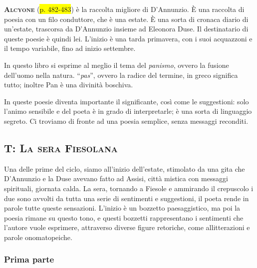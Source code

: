 \documentclass{book}
\newcommand{\pagine}[1]{\colorbox{yellow}{#1}}
\newcounter{mar}
\begin{document}
\textsc{\textbf{Alcyone}} (\pagine{p. 482-483}) è la raccolta migliore di
D'Annunzio. È una raccolta di poesia con un filo conduttore, che è una
estate. È una sorta di cronaca diario di un'estate, trascorsa da
D'Annunzio insieme ad Eleonora Duse. Il destinatario di queste poesie è
quindi lei. L'inizio è una tarda primavera, con i suoi acquazzoni e il
tempo variabile, fino ad inizio settembre.

In questo libro si esprime al meglio il tema del \emph{panismo}, ovvero
la fusione dell'uomo nella natura. ``\emph{pas}'', ovvero la radice del
termine, in greco significa tutto; inoltre Pan è una divinità boschiva.

In queste poesie diventa importante il significante, così come le
suggestioni: solo l'animo sensibile e del poeta è in grado di
interpretarle; è una sorta di linguaggio segreto. Ci troviamo di fronte
ad una poesia semplice, senza messaggi reconditi.

\subsection{T: \textsc{La sera Fiesolana}}

Una delle prime del ciclo, siamo all'inizio dell'estate, stimolato da
una gita che D'Annunzio e la Duse avevano fatto ad Assisi, città mistica
con messaggi spirituali, giornata calda. La sera, tornando a Fiesole e
ammirando il crepuscolo i due sono avvolti da tutta una serie di
sentimenti e suggestioni, il poeta rende in parole tutte queste
sensazioni. L'inizio è un bozzetto paesaggistico, ma poi la poesia
rimane su questo tono, e questi bozzetti rappresentano i sentimenti che
l'autore vuole esprimere, attraverso diverse figure retoriche, come
allitterazioni e parole onomatopeiche.

\setcounter{mar}{0}

\subsubsection{Prima parte}
\end{document}
